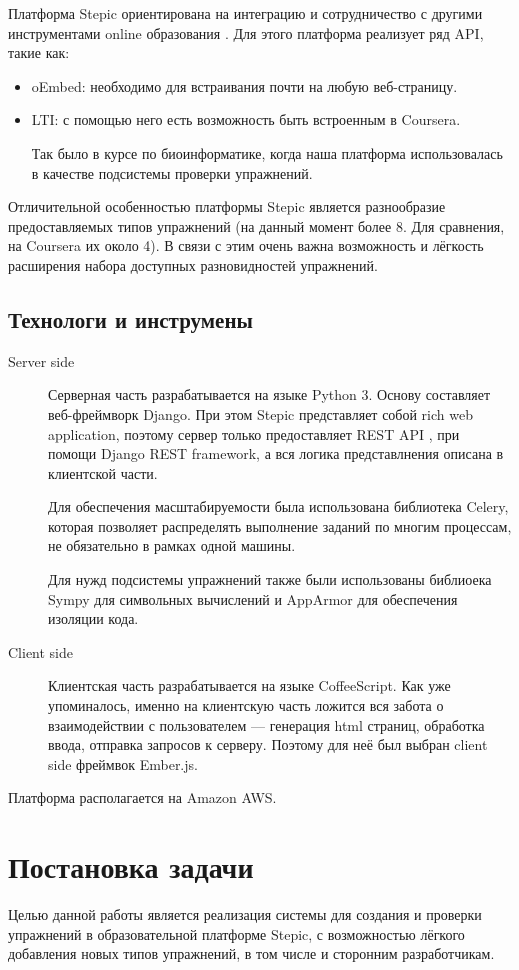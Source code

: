 \documentclass{matmex-diploma-custom}
\begin{document}
Платформа Stepic ориентирована на интеграцию и сотрудничество с
другими инструментами online образования \cite{dagger2007service}. Для
этого платформа реализует ряд API, такие как:
\begin{itemize}
\item oEmbed: необходимо для встраивания почти на любую веб-страницу.
\item LTI: с помощью него есть возможность быть встроенным в Coursera.

  Так было в курсе по биоинформатике, когда наша платформа
  использовалась в качестве подсистемы проверки упражнений.
\end{itemize}

Отличительной особенностью платформы Stepic является разнообразие
предоставляемых типов упражнений (на данный момент более 8. Для
сравнения, на Coursera их около 4).  В связи с этим очень важна
возможность и лёгкость расширения набора доступных разновидностей
упражнений.

\subsection{Технологи и инструмены}
\begin{description}
\item[Server side] Серверная часть разрабатывается на языке Python
  3. Основу составляет веб-фреймворк Django. При этом Stepic
  представляет собой rich web application, поэтому сервер только
  предоставляет REST API \cite{rest}, при помощи Django REST
  framework, а вся логика представлнения описана в клиентской части.

  Для обеспечения масштабируемости была использована библиотека
  Celery, которая позволяет распределять выполнение заданий по многим
  процессам, не обязательно в рамках одной машины.

  Для нужд подсистемы упражнений также были использованы библиоека
  Sympy для символьных вычислений и AppArmor для обеспечения изоляции кода.
\item[Client side] Клиентская часть разрабатывается на языке
  CoffeeScript. Как уже упоминалось, именно на клиентскую часть
  ложится вся забота о взаимодействии с пользователем --- генерация
  html страниц, обработка ввода, отправка запросов к серверу. Поэтому
  для неё был выбран client side фреймвок Ember.js.
\end{description}

Платформа располагается на Amazon AWS.
\section{Постановка задачи}
Целью данной работы является реализация системы для создания и проверки
упражнений в образовательной платформе Stepic, с возможностью лёгкого
добавления новых типов упражнений, в том числе и сторонним
разработчикам.
\end{document}
